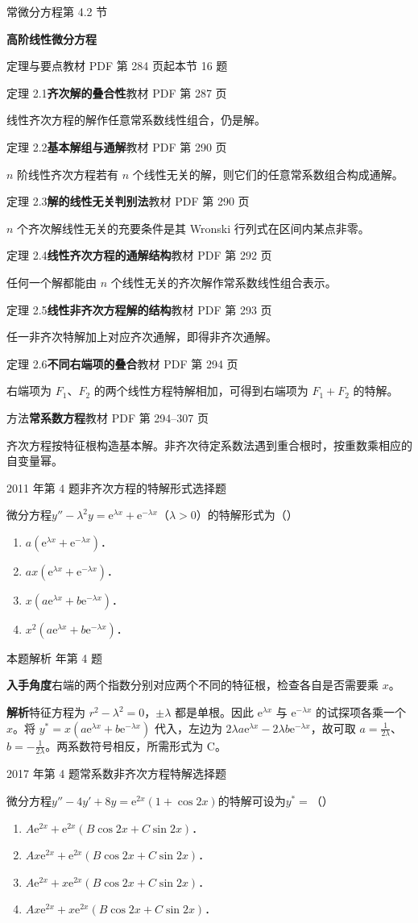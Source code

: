 \documentclass[UTF8,zihao=-4,fontset=fandol]{ctexart}
\newcommand{\SectionHeading}[4]{%
  \clearpage\hypertarget{sec-#1}{}%
  {\small\textcolor{accent}{#2\hfill 第 #1 节}}\par\medskip
  {\LARGE\bfseries #3}\par\smallskip
  {\small\textcolor{muted}{#4}}\par\bigskip}
\newcommand{\Theory}[4]{%
  {\small\textcolor{accent}{#1}\quad\textbf{#3}\hfill\textcolor{muted}{教材 PDF 第 #2 页}}\par
  {\small #4}\par\smallskip}
\newcommand{\pickout}{\hfill（\hspace{1.4em}）}
\newenvironment{abcd}{\begin{enumerate}[label=\textup{(\Alph*)},leftmargin=2.3em,itemsep=1pt,topsep=4pt,parsep=1pt]}{\end{enumerate}}
\newcommand{\QuestionPage}[6]{%
  \par\noindent\begin{minipage}{\linewidth}
  \raggedright
  {\small\textcolor{black!60}{#3\quad #5}\hfill\textcolor{accent}{#2}}\par\smallskip}
\newcommand{\QuestionEnd}{\end{minipage}\par\medskip}
\newcommand{\QuestionPage}[6]{%
  \clearpage
  {\small\textcolor{accent}{#1\hfill #2}}\par\medskip
  {\small\textcolor{black!60}{#3\quad #5\hfill #6}}\par\vspace{9bp}}
\newcommand{\QuestionEnd}{}
\newenvironment{QuestionSolution}[1]{%
  \clearpage
  {\small\textcolor{black!60}{本题解析\quad #1}}\par\medskip
}{\par\clearpage}
\begin{document}
\SectionHeading{4.2}{常微分方程}{高阶线性微分方程}{定理与要点\quad 教材 PDF 第 284 页起\hfill 本节 16 题}
\Theory{定理 2.1}{287}{齐次解的叠合性}{线性齐次方程的解作任意常系数线性组合，仍是解。}
\Theory{定理 2.2}{290}{基本解组与通解}{\(n\) 阶线性齐次方程若有 \(n\) 个线性无关的解，则它们的任意常系数组合构成通解。}
\Theory{定理 2.3}{290}{解的线性无关判别法}{\(n\) 个齐次解线性无关的充要条件是其 Wronski 行列式在区间内某点非零。}
\Theory{定理 2.4}{292}{线性齐次方程的通解结构}{任何一个解都能由 \(n\) 个线性无关的齐次解作常系数线性组合表示。}
\Theory{定理 2.5}{293}{线性非齐次方程解的结构}{任一非齐次特解加上对应齐次通解，即得非齐次通解。}
\Theory{定理 2.6}{294}{不同右端项的叠合}{右端项为 \(F_1\)、\(F_2\) 的两个线性方程特解相加，可得到右端项为 \(F_1+F_2\) 的特解。}
\Theory{方法}{294--307}{常系数方程}{齐次方程按特征根构造基本解。非齐次待定系数法遇到重合根时，按重数乘相应的自变量幂。}
\QuestionPage{4.2 高阶线性微分方程}{选择题}{2011 年第 4 题}{1}{非齐次方程的特解形式}{219 / 234}
微分方程$y'' - \lambda^2 y = \mathrm{e}^{\lambda x} + \mathrm{e}^{- \lambda x}$（$\lambda > 0$）的特解形式为\pickout{}
\begin{abcd}
\item $a(\mathrm{e}^{\lambda x} + \mathrm{e}^{- \lambda x})$．
\item $ax(\mathrm{e}^{\lambda x} + \mathrm{e}^{- \lambda x})$．
\item $x(a\mathrm{e}^{\lambda x} + b\mathrm{e}^{- \lambda x})$．
\item $x^2(a\mathrm{e}^{\lambda x} + b\mathrm{e}^{- \lambda x})$．
\end{abcd}
\QuestionEnd

\begin{QuestionSolution}{2011 年第 4 题}
\textbf{入手角度}\quad 右端的两个指数分别对应两个不同的特征根，检查各自是否需要乘 \(x\)。

\textbf{解析}\quad 特征方程为 \(r^2-\lambda^2=0\)，\(\pm\lambda\) 都是单根。因此 \(\mathrm{e}^{\lambda x}\) 与 \(\mathrm{e}^{-\lambda x}\) 的试探项各乘一个 \(x\)。将 \(y^*=x(a\mathrm{e}^{\lambda x}+b\mathrm{e}^{-\lambda x})\) 代入，左边为 \(2\lambda a \mathrm{e}^{\lambda x}-2\lambda b \mathrm{e}^{-\lambda x}\)，故可取 \(a=\frac{1}{2\lambda}\)、\(b=-\frac{1}{2\lambda}\)。两系数符号相反，所需形式为 C。
\end{QuestionSolution}

\QuestionPage{4.2 高阶线性微分方程}{选择题}{2017 年第 4 题}{1}{常系数非齐次方程特解}{220 / 234}
微分方程$y'' - 4y' + 8y = \mathrm{e}^{2x}(1 + \cos 2x)$的特解可设为$y^* =$\pickout{}
\begin{abcd}
\item $A\mathrm{e}^{2x} + \mathrm{e}^{2x}\left(B\cos 2x + C\sin 2x \right)$．
\item $Ax \mathrm{e}^{2x} + \mathrm{e}^{2x}\left(B\cos 2x + C\sin 2x \right)$．
\item $A\mathrm{e}^{2x} + x\mathrm{e}^{2x}\left(B\cos 2x + C\sin 2x \right)$．
\item $Ax \mathrm{e}^{2x} + x\mathrm{e}^{2x}\left(B\cos 2x + C\sin 2x \right)$．
\end{abcd}
\QuestionEnd
\end{document}
